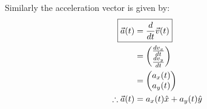 Similarly the acceleration vector is given by:
\begin{align}
\label{eqn:describingmotioninnd:avecdef}
\Aboxed{\vec a(t) &= \frac{d}{dt}\vec v(t)} \\
&=\begin{pmatrix}
           \frac{dv_x}{dt}  \\
          \frac{dv_y}{dt}  \\
         \end{pmatrix}\nonumber\\
&=\begin{pmatrix}
           a_x(t) \\
           a_y(t) \\
         \end{pmatrix}\nonumber\\
\therefore \vec a(t) &= a_x(t)\hat x+a_y(t)\hat y      \nonumber        
\end{align}

